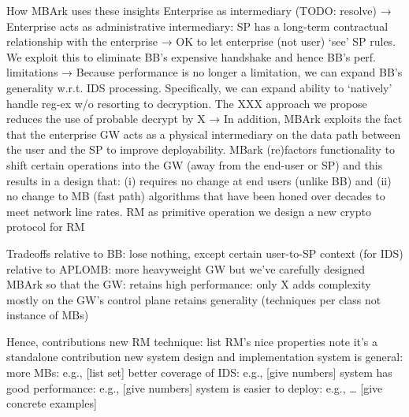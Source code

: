   How MBArk uses these insights
Enterprise as intermediary (TODO: resolve)
  → Enterprise acts as administrative intermediary: SP has a 
  long-term contractual relationship with the enterprise  → OK to let  
  enterprise (not user) `see’ SP rules. We exploit this to eliminate 
  BB’s expensive handshake and hence BB’s perf. limitations
  → Because performance is no longer a limitation, we can expand 
  BB’s generality w.r.t. IDS processing. Specifically, we can expand 
  ability to `natively’ handle reg-ex w/o resorting to decryption. The 
  XXX approach we propose reduces the use of probable decrypt 
  by X%
  → In addition, MBArk exploits the fact that the enterprise GW acts as 
  a physical intermediary on the data path between the user and the 
  SP to improve deployability. MBark (re)factors functionality to shift 
certain operations into the GW (away from the end-user or SP) 
  and this results in a design that: (i) requires no change at end 
  users (unlike BB) and (ii) no change to MB (fast path) algorithms 
  that have been honed over decades to meet network line rates. 
  RM as primitive operation
  we design a new crypto protocol for RM


  Tradeoffs
relative to BB: lose nothing, except certain user-to-SP context (for IDS) 
  relative to APLOMB: more heavyweight GW but we’ve carefully designed MBArk so that the GW:
  retains high performance: only X%
  adds complexity mostly on the GW’s control plane
retains generality (techniques per class not instance of MBs)

  Hence, contributions
  new RM technique:
  list RM’s nice properties
  note it’s a standalone contribution
  new system design and implementation 
  system is general: 
  more MBs: e.g., [list set]
  better coverage of IDS: e.g., [give numbers]
  system has good performance: e.g., [give numbers] 
  system is easier to deploy: e.g., … [give concrete examples]



